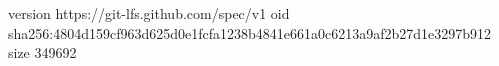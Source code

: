 version https://git-lfs.github.com/spec/v1
oid sha256:4804d159cf963d625d0e1fcfa1238b4841e661a0c6213a9af2b27d1e3297b912
size 349692
